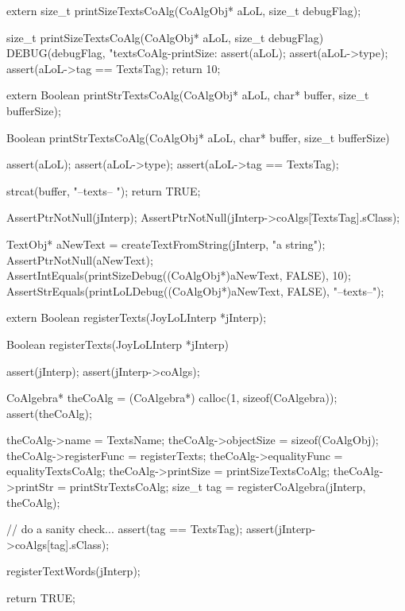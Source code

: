 \startCHeader
extern size_t printSizeTextsCoAlg(CoAlgObj* aLoL, size_t debugFlag);
\stopCHeader

\startCCode
size_t printSizeTextsCoAlg(CoAlgObj* aLoL, size_t debugFlag) {
  DEBUG(debugFlag, "textsCoAlg-printSize: %
  assert(aLoL);
  assert(aLoL->type);
  assert(aLoL->tag == TextsTag);
  return 10;
}
\stopCCode

\startCHeader
extern Boolean printStrTextsCoAlg(CoAlgObj* aLoL,
                                 char* buffer, size_t bufferSize);
\stopCHeader

\startCCode
Boolean printStrTextsCoAlg(CoAlgObj* aLoL,
                          char* buffer, size_t bufferSize) {
  assert(aLoL);
  assert(aLoL->type);
  assert(aLoL->tag == TextsTag);

  strcat(buffer, "--texts-- ");
  return TRUE;
}
\stopCCode


\startCTest
  AssertPtrNotNull(jInterp);
  AssertPtrNotNull(jInterp->coAlgs[TextsTag].sClass);

  TextObj* aNewText = createTextFromString(jInterp, "a string");
  AssertPtrNotNull(aNewText);
  AssertIntEquals(printSizeDebug((CoAlgObj*)aNewText, FALSE), 10);
  AssertStrEquals(printLoLDebug((CoAlgObj*)aNewText, FALSE), "--texts--");
\stopCTest
\stopTestCase
\stopTestSuite

\startTestSuite[registerTexts]

\startCHeader
extern Boolean registerTexts(JoyLoLInterp *jInterp);
\stopCHeader

\startCCode
Boolean registerTexts(JoyLoLInterp *jInterp) {
  assert(jInterp);
  assert(jInterp->coAlgs);
  
  CoAlgebra* theCoAlg    = (CoAlgebra*) calloc(1, sizeof(CoAlgebra));
  assert(theCoAlg);
  
  theCoAlg->name         = TextsName;
  theCoAlg->objectSize   = sizeof(CoAlgObj);
  theCoAlg->registerFunc = registerTexts;
  theCoAlg->equalityFunc = equalityTextsCoAlg;
  theCoAlg->printSize    = printSizeTextsCoAlg;
  theCoAlg->printStr     = printStrTextsCoAlg;
  size_t tag = registerCoAlgebra(jInterp, theCoAlg);
  
  // do a sanity check...
  assert(tag == TextsTag);
  assert(jInterp->coAlgs[tag].sClass);
  
  registerTextWords(jInterp);
  
  return TRUE;
}
\stopCCode


